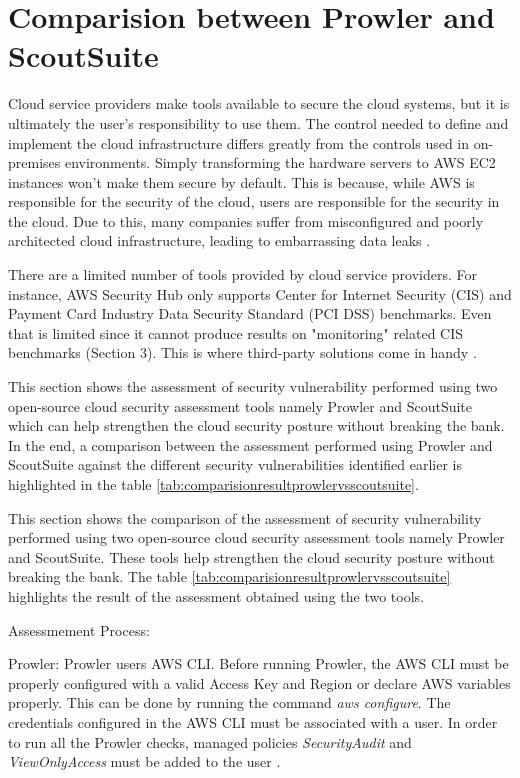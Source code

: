 \section{Comparision between Prowler and ScoutSuite}

\par Cloud service providers make tools available to secure the cloud systems, but it is ultimately the user’s responsibility to use them.
The control needed to define and implement the cloud infrastructure differs greatly from the controls used in on-premises environments.
Simply transforming the hardware servers to AWS EC2 instances won't make them secure by default.
This is because, while AWS is responsible for the security of the cloud, users are responsible for the security in the cloud.
Due to this, many companies suffer from misconfigured and poorly architected cloud infrastructure, leading to embarrassing data leaks \cite{74}.

\par There are a limited number of tools provided by cloud service providers.
For instance, AWS Security Hub only supports Center for Internet Security (CIS) and Payment Card Industry Data
Security Standard (PCI DSS) benchmarks.
Even that is limited since it cannot produce results on "monitoring" related CIS benchmarks (Section 3).
This is where third-party solutions come in handy \cite{74}.

\par This section shows the assessment of security vulnerability performed using two open-source cloud security assessment tools namely Prowler and ScoutSuite which can help strengthen the cloud security posture without breaking the bank.
In the end, a comparison between the assessment performed using Prowler and ScoutSuite against the different security vulnerabilities identified earlier is highlighted in the table \ref{tab:comparisionresultprowlervsscoutsuite}.

\par This section shows the comparison of the assessment of security vulnerability performed using two open-source cloud security assessment tools namely Prowler and ScoutSuite.
These tools help strengthen the cloud security posture without breaking the bank.
The table \ref{tab:comparisionresultprowlervsscoutsuite} highlights the result of the assessment obtained using the two tools.

\par Assessmement Process:


\par Prowler: Prowler users AWS CLI. Before running Prowler, the AWS CLI must be properly configured with a valid Access Key and Region or declare AWS variables properly.
This can be done by running the command \textit{aws configure}.
The credentials configured in the AWS CLI must be associated with a user.
In order to run all the Prowler checks, managed policies \textit{SecurityAudit} and \textit{ViewOnlyAccess} must be added to the user \cite{75}.

